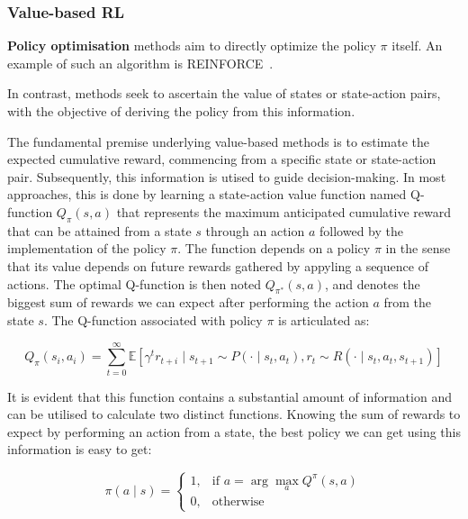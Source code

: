 \subsubsection{Value-based RL}
\textbf{Policy optimisation} methods aim to directly optimize the policy $\pi$ itself.
An example of such an algorithm is REINFORCE~\citep{williams1992simple}.

In contrast,  methods seek to ascertain the value of states or state-action pairs, with the
objective of deriving the policy from this information.

The fundamental premise underlying value-based methods is to estimate the expected cumulative reward, commencing from a
specific state or state-action pair.
Subsequently, this information is utised to guide decision-making.
In most approaches, this is done by learning a state-action value function named Q-function $Q_\pi(s, a)$ that represents
the maximum anticipated cumulative reward that can be attained from a state $s$ through an action $a$
followed by the implementation of the policy $\pi$.
The function depends on a policy $\pi$ in the sense that its value depends on future rewards gathered by appyling a sequence of actions.
The optimal Q-function is then noted $Q_{\pi^*}(s, a)$, and denotes the biggest sum of rewards we can expect after
performing the action $a$ from the state $s$.
The Q-function associated with policy $\pi$ is articulated as: %

\begin{equation} \label{eq:bg:rl:q_function}
    Q_\pi(s_i, a_i) = \sum_{t=0}^\infty \mathbb{E} \left[ \gamma^t r_{t+i} \mid s_{t+1} \sim P(\cdot \mid s_t, a_t), r_t \sim R(\cdot \mid s_t, a_t, s_{t+1}) \right]
\end{equation}

It is evident that this function contains a substantial amount of information and can be utilised to calculate two
distinct functions.
Knowing the sum of rewards to expect by performing an action from a state, the best policy we can get using this
information is easy to get:

\begin{equation} \label{eq:bg:rl:pi_from_q_function}
    \pi(a \mid s) =
    \begin{cases}
    1, & \text{if } a = \arg\max_a Q^{\pi}(s, a) \\
    0, & \text{otherwise}
    \end{cases}
\end{equation}

